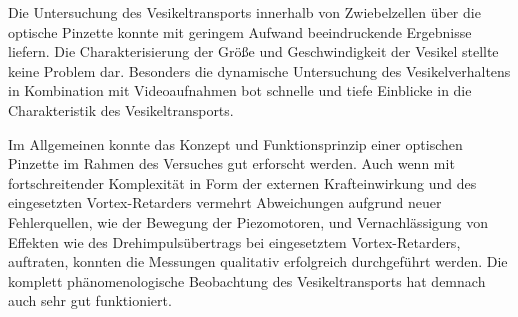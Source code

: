     Die Untersuchung des Vesikeltransports innerhalb von Zwiebelzellen über die optische Pinzette konnte mit geringem Aufwand beeindruckende Ergebnisse liefern. Die Charakterisierung der Größe und
    Geschwindigkeit der Vesikel stellte keine Problem dar. Besonders die dynamische Untersuchung des Vesikelverhaltens in Kombination mit Videoaufnahmen bot schnelle und tiefe Einblicke in die
    Charakteristik des Vesikeltransports.

    Im Allgemeinen konnte das Konzept und Funktionsprinzip einer optischen Pinzette im Rahmen des Versuches gut erforscht werden. Auch wenn mit fortschreitender Komplexität in Form der externen Krafteinwirkung
    und des eingesetzten Vortex-Retarders vermehrt Abweichungen aufgrund neuer Fehlerquellen, wie der Bewegung der Piezomotoren, und Vernachlässigung von Effekten wie des Drehimpulsübertrags bei
    eingesetztem Vortex-Retarders, auftraten, konnten die Messungen qualitativ erfolgreich durchgeführt werden. Die komplett phänomenologische Beobachtung des Vesikeltransports hat demnach auch 
    sehr gut funktioniert. 
